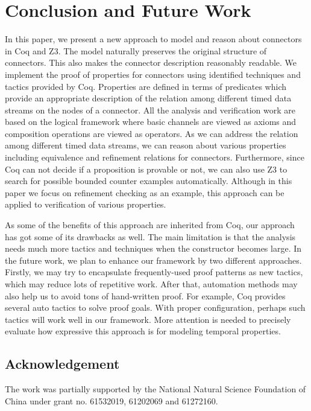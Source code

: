 \documentclass[preprint,3p]{elsarticle}
\begin{document}
\section{Conclusion and Future Work}\label{sec:conclusion}
In this paper, we present a new approach to model and reason about connectors in Coq and Z3. The model naturally
preserves the original structure of connectors. This also makes the connector description reasonably readable. We
implement the proof of properties for connectors using identified techniques and tactics provided by Coq. Properties are
defined in terms of predicates which provide an appropriate description of the relation among different
timed data streams on the nodes of a connector. All the analysis and verification work are based on the logical framework
where basic channels are viewed as axioms and composition operations are viewed as operators. As we can address
the relation among different timed data streams, we can reason about various properties including equivalence and refinement relations for connectors. Furthermore, since Coq can not decide if a proposition is provable or not, we can also use Z3 to search for possible bounded counter examples automatically. Although in this paper we focus on refinement checking as an example, this approach can be applied to verification of various properties.

As some of the benefits of this approach are inherited from Coq, our approach has got some of its drawbacks as well.
The main limitation is that the analysis needs much more tactics and techniques when the constructor becomes large.
In the future work, we plan to enhance our framework by two different approaches. Firstly, we may try to encapsulate
frequently-used proof patterns as new tactics, which may reduce lots of repetitive work. After that, automation methods
may also help us to avoid tons of hand-written proof. For example, Coq provides several auto tactics to solve proof
goals. With proper configuration, perhaps such tactics will work well in our framework. More attention is needed to precisely
evaluate how expressive this approach is for modeling temporal properties.

\subsection*{Acknowledgement}
\noindent The work was partially supported by the National Natural Science Foundation of China under grant no. 61532019, 61202069 and 61272160.

%


\end{document}
